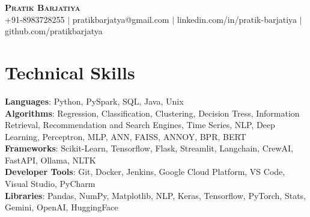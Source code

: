 \documentclass[letterpaper,11pt]{article}
\begin{document}

\begin{center}
    \textbf{\Huge \scshape Pratik Barjatiya} \\ \vspace{1pt}
    \small {\faMobile} +91-8983728255 $|$ \href{mailto:pratikbarjatya@gmail.com}  {\faEnvelope}{pratikbarjatya@gmail.com} $|$ 
    \href{https://linkedin.com/in/pratik-barjatiya} {\faLinkedin} {linkedin.com/in/pratik-barjatiya} $|$
    \href{https://github.com/pratikbarjatya} {\faGithub} {github.com/pratikbarjatya}
\end{center}


\section{Technical Skills}
 \begin{itemize}[leftmargin=0.15in, label={}]
    \small{\item{
     \textbf{Languages}{: Python, PySpark, SQL, Java, Unix} \\
     \textbf{Algorithms}{: Regression, Classification, Clustering, Decision Tress, Information Retrieval, Recommendation and Search Engines, Time Series, NLP, Deep Learning, Perceptron, MLP, ANN, FAISS, ANNOY, BPR, BERT} \\
     \textbf{Frameworks}{: Scikit-Learn, Tensorflow, Flask, Streamlit, Langchain, CrewAI, FastAPI, Ollama, NLTK} \\
     \textbf{Developer Tools}{: Git, Docker, Jenkins, Google Cloud Platform, VS Code, Visual Studio, PyCharm} \\
     \textbf{Libraries}{: Pandas, NumPy, Matplotlib, NLP, Keras, Tensorflow, PyTorch, Stats, Gemini, OpenAI, HuggingFace}
    }}
 \end{itemize}
\end{document}
